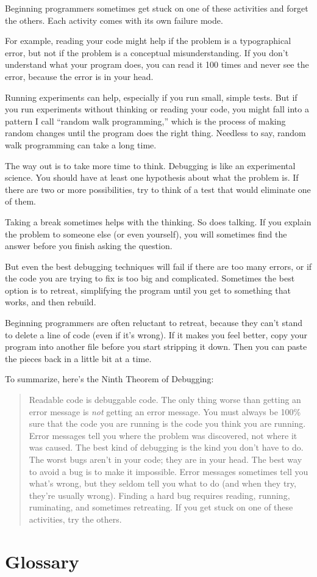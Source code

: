 \documentclass[
]{book}
\numberwithin{Answer}{chapter}
\numberwithin{Exercise}{chapter}
\newcommand{\displaythrm}[1]{%
    \ifthenelse{\equal{#1}{1}}%
        {Readable code is debuggable code.}{%
    \ifthenelse{\equal{#1}{2}}%
        {The only thing worse than getting an error message is {\em
         not} getting an error message.}{%
    \ifthenelse{\equal{#1}{3}}%
        {You must always be 100\% sure that the code you are running
         is the code you think you are running.}{%
    \ifthenelse{\equal{#1}{4}}%
        {Error messages tell you where the problem was discovered,
         not where it was caused.}{%
    \ifthenelse{\equal{#1}{5}}%
        {The best kind of debugging is the kind you don't have to do.}{%
    \ifthenelse{\equal{#1}{6}}%
        {The worst bugs aren't in your code; they are in your head.}{%
    \ifthenelse{\equal{#1}{7}}%
        {The best way to avoid a bug is to make it impossible.}{%
    \ifthenelse{\equal{#1}{8}}%
        {Error messages sometimes tell you what's wrong, but they
         seldom tell you what to do (and when they try, they're usually
         wrong).}{%
    \ifthenelse{\equal{#1}{9}}%
        {Finding a hard bug requires reading, running, ruminating,
         and sometimes retreating.  If you get stuck on one of these
         activities, try the others.}{%
    {}%
}}}}}}}}}}%
\begin{document}
Beginning programmers sometimes get stuck on one of these activities
and forget the others.  Each activity comes with its own failure
mode.

For example, reading your code might help if the problem is a
typographical error, but not if the problem is a conceptual
misunderstanding.  If you don't understand what your program does, you
can read it 100 times and never see the error, because the error is in
your head.

Running experiments can help, especially if you run small, simple
tests.  But if you run experiments without thinking or reading your
code, you might fall into a pattern I call ``random walk programming,''
which is the process of making random changes until the program
does the right thing.  Needless to say, random walk programming
can take a long time.

The way out is to take more time to think.  Debugging is like an
experimental science.  You should have at least one hypothesis about
what the problem is.  If there are two or more possibilities, try to
think of a test that would eliminate one of them.

Taking a break sometimes helps with the thinking.  So does talking.
If you explain the problem to someone else (or even yourself), you
will sometimes find the answer before you finish asking the question.

But even the best debugging techniques will fail if there are too many
errors, or if the code you are trying to fix is too big and
complicated.  Sometimes the best option is to retreat, simplifying the
program until you get to something that works, and then rebuild.

Beginning programmers are often reluctant to retreat, because
they can't stand to delete a line of code (even if it's wrong).
If it makes you feel better, copy your program into another file
before you start stripping it down.  Then you can paste the pieces
back in a little bit at a time.

To summarize, here's the Ninth Theorem of Debugging:

\begin{quote}
\displaythrm{9}
\end{quote}



\section{Glossary}
\end{document}
